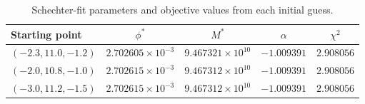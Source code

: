 \begin{table}[H]
\centering
\small
\begin{tabular}{lcccc}
\toprule
Starting point & $\phi^*$ & $M^*$ & $\alpha$ & $\chi^2$\\
\midrule
$(-2.3,11.0,-1.2)$ & $2.702605\times10^{-3}$ & $9.467321\times10^{10}$ & $-1.009391$ & $2.908056$\\
$(-2.0,10.8,-1.0)$ & $2.702615\times10^{-3}$ & $9.467312\times10^{10}$ & $-1.009391$ & $2.908056$\\
$(-3.0,11.2,-1.5)$ & $2.702615\times10^{-3}$ & $9.467312\times10^{10}$ & $-1.009391$ & $2.908056$\\
\bottomrule
\end{tabular}
\caption{Schechter-fit parameters and objective values from each initial guess.}
\label{tab:starts}
\end{table}
